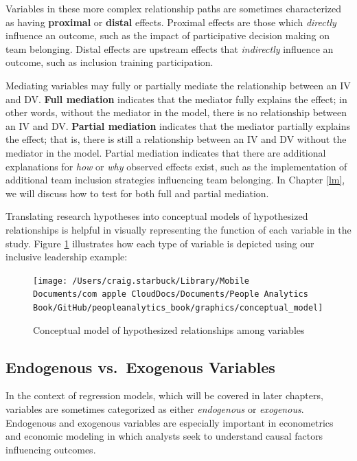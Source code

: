\documentclass[
]{book}
\begin{document}
Variables in these more complex relationship paths are sometimes characterized as having \textbf{proximal} or \textbf{distal} effects. Proximal effects are those which \emph{directly} influence an outcome, such as the impact of participative decision making on team belonging. Distal effects are upstream effects that \emph{indirectly} influence an outcome, such as inclusion training participation.

Mediating variables may fully or partially mediate the relationship between an IV and DV. \textbf{Full mediation} indicates that the mediator fully explains the effect; in other words, without the mediator in the model, there is no relationship between an IV and DV. \textbf{Partial mediation} indicates that the mediator partially explains the effect; that is, there is still a relationship between an IV and DV without the mediator in the model. Partial mediation indicates that there are additional explanations for \emph{how} or \emph{why} observed effects exist, such as the implementation of additional team inclusion strategies influencing team belonging. In Chapter \ref{lm}, we will discuss how to test for both full and partial mediation.

Translating research hypotheses into conceptual models of hypothesized relationships is helpful in visually representing the function of each variable in the study. Figure \ref{fig:concept-mdl} illustrates how each type of variable is depicted using our inclusive leadership example:

\begin{figure}

{\centering \texttt{[image: /Users/craig.starbuck/Library/Mobile Documents/com~apple~CloudDocs/Documents/People Analytics Book/GitHub/peopleanalytics\_book/graphics/conceptual\_model]} 

}

\caption{Conceptual model of hypothesized relationships among variables}\label{fig:concept-mdl}
\end{figure}

\hypertarget{endogenous-vs.-exogenous-variables}{%
\subsection{Endogenous vs.~Exogenous Variables}\label{endogenous-vs.-exogenous-variables}}

In the context of regression models, which will be covered in later chapters, variables are sometimes categorized as either \emph{endogenous} or \emph{exogenous}. Endogenous and exogenous variables are especially important in econometrics and economic modeling in which analysts seek to understand causal factors influencing outcomes.
\end{document}
